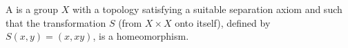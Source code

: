 A  is a group $X$ with a topology satisfying a suitable separation axiom and such that the transformation $S$ (from $X \times X$ onto itself), defined by $S(x,y) = (x,xy)$, is a homeomorphism.
